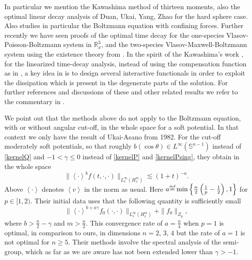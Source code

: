 \documentclass{amsart}
\numberwithin{equation}{section}
\begin{document}
In particular we mention the Kawashima \cite{MR1057534} method of thirteen moments, also the optimal linear decay analysis of Duan, Ukai, Yang, Zhao \cite{MR2357430} for the hard sphere case.  
Also \cite{D-Hypo} studies in particular the Boltzmann equation with confining forces.
Further recently we have seen proofs of the optimal time decay for the one-species Vlasov-Poisson-Boltzmann system \cite{arXiv:0912.1742}  in ${\mathbb{R}}^3_x$, and the two-species Vlasov-Maxwell-Boltzmann system \cite{2010arXiv1006.3605D} using the existence theory from \cite{MR2259206}.
In the spirit of the Kawashima's work \cite{MR1057534}, for the linearized time-decay  analysis, instead of using the compensation function as in \cite{MR1057534}, a key idea in \cite{D-Hypo,arXiv:0912.1742,2010arXiv1006.3605D} is to design several interactive functionals in order to exploit  the dissipation which is present in the degenerate parts of the solution.  For further references and discussions of these and other related results we refer to the commentary in \cite{arXiv:0912.1742,2010arXiv1006.3605D}.

 
 We point out that the methods above do not apply to the Boltzmann equation, with or without angular cut-off, in the whole space for a soft potential.  In that context we only have the result of Ukai-Asano \cite{MR677262} from 1982.   
For the cut-off moderately soft potentials, so that roughly $b(\cos\theta)\in L^\infty({{\mathbb S}^{{n}-1}})$ instead of \eqref{kernelQ} and $-1< \gamma \le 0$ instead of \eqref{kernelP} and \eqref{kernelPsing}, they obtain in the whole space
$$
\| { \left< {{\cdot}} \right> }^{b} {f}(t,\cdot,\cdot) \|_{L^\infty_v(H^m_x)}
\lesssim (1+t)^{-a}.
$$
Above ${ \left< {{\cdot}} \right> }$ denotes ${ \left< {v} \right> }$ in the norm as usual.  Here $a {\overset{\mbox{\tiny{def}}}{=}} \min\left\{\frac{n}{2}\left(\frac{1}{p} - \frac{1}{2}\right), 1\right\}$ for $p\in [1,2)$.  
Their initial data uses that the following quantity is sufficiently small  
$$
\| { \left< {{\cdot}} \right> }^{{b}+a \gamma} {f}_0(\cdot,\cdot) \|_{L^\infty_v(H^m_x)}
+ \| {f}_0\|_{Z_p},
$$
where ${b} > \frac{n}{2} - \gamma$ and $m > \frac{n}{2}$.
This convergence rate of $a=\frac{n}{4}$ when $p=1$ is optimal, in comparison to ours, in dimensions ${n} =2$, $3$, $4$ but the rate of $a=1$ is not optimal for ${n} \ge 5$.  Their methods involve the spectral analysis of the semi-group, which as far as we are aware has not been extended lower than $\gamma>-1$.  
\end{document}
